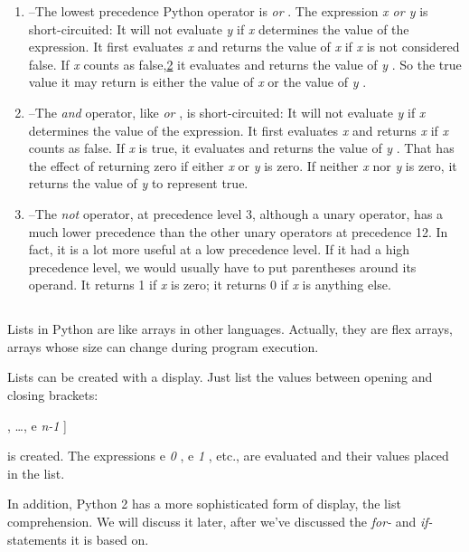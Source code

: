 \begin{enumerate}
\tightlist
\item
  
  --The lowest precedence Python operator is \emph{or} . The expression
  \emph{x or y} is short-circuited: It will not evaluate \emph{y} if
  \emph{x} determines the value of the expression. It first evaluates
  \emph{x} and returns the value of \emph{x} if \emph{x} is not
  considered false. If \emph{x} counts as
  false,\protect\hyperlink{pgfId-123468}{2} it evaluates and returns the
  value of \emph{y} . So the true value it may return is either the
  value of \emph{x} or the value of \emph{y} .
\item
  
  --The \emph{and} operator, like \emph{or} , is short-circuited: It
  will not evaluate \emph{y} if \emph{x} determines the value of the
  expression. It first evaluates \emph{x} and returns \emph{x} if
  \emph{x} counts as false. If \emph{x} is true, it evaluates and
  returns the value of \emph{y} . That has the effect of returning zero
  if either \emph{x} or \emph{y} is zero. If neither \emph{x} nor
  \emph{y} is zero, it returns the value of \emph{y} to represent true.
\item
   --The
  \emph{not} operator, at precedence level 3, although a unary operator,
  has a much lower precedence than the other unary operators at
  precedence 12. In fact, it is a lot more useful at a low precedence
  level. If it had a high precedence level, we would usually have to put
  parentheses around its operand. It returns 1 if \emph{x} is zero; it
  returns 0 if \emph{x} is anything else.
\end{enumerate}

\subsection[Lists]{}

Lists in Python are like arrays in
other languages. Actually, they are flex arrays, arrays whose size can
change during program execution.

Lists can be created with a
display. Just list the values between opening and closing brackets:

 ,
\ldots{}, e \emph{n-1} {]}

 is
created. The expressions e \emph{0} , e \emph{1} , etc., are evaluated
and their values placed in the list.

In addition, Python 2 has a more
sophisticated form of display, the list comprehension. We will discuss
it later, after we've discussed the \emph{for-} and \emph{if-}
statements it is based on.

